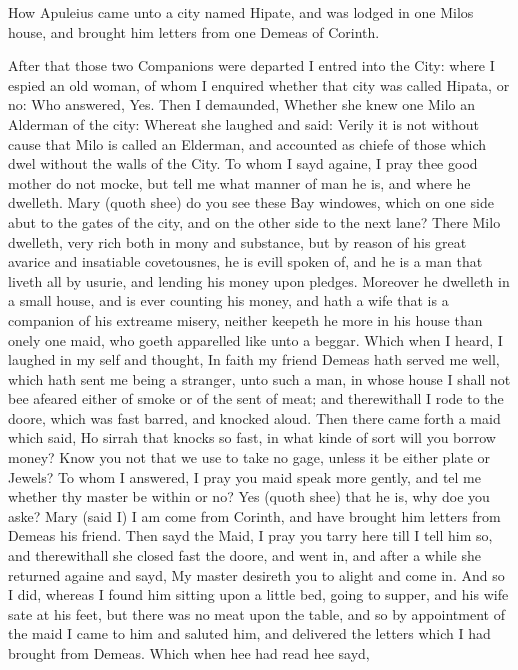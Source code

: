 
How Apuleius came unto a city named Hipate, and was lodged in one Milos house,
and brought him letters from one Demeas of Corinth.

After that those two Companions were departed I entred into the City: where I
espied an old woman, of whom I enquired whether that city was called Hipata, or
no: Who answered, Yes. Then I demaunded, Whether she knew one Milo an Alderman
of the city: Whereat she laughed and said: Verily it is not without cause that
Milo is called an Elderman, and accounted as chiefe of those which dwel without
the walls of the City. To whom I sayd againe, I pray thee good mother do not
mocke, but tell me what manner of man he is, and where he dwelleth. Mary (quoth
shee) do you see these Bay windowes, which on one side abut to the gates of the
city, and on the other side to the next lane? There Milo dwelleth, very rich
both in mony and substance, but by reason of his great avarice and insatiable
covetousnes, he is evill spoken of, and he is a man that liveth all by usurie,
and lending his money upon pledges. Moreover he dwelleth in a small house, and
is ever counting his money, and hath a wife that is a companion of his extreame
misery, neither keepeth he more in his house than onely one maid, who goeth
apparelled like unto a beggar. Which when I heard, I laughed in my self and
thought, In faith my friend Demeas hath served me well, which hath sent me
being a stranger, unto such a man, in whose house I shall not bee afeared
either of smoke or of the sent of meat; and therewithall I rode to the doore,
which was fast barred, and knocked aloud. Then there came forth a maid which
said, Ho sirrah that knocks so fast, in what kinde of sort will you borrow
money? Know you not that we use to take no gage, unless it be either plate or
Jewels? To whom I answered, I pray you maid speak more gently, and tel me
whether thy master be within or no? Yes (quoth shee) that he is, why doe you
aske? Mary (said I) I am come from Corinth, and have brought him letters from
Demeas his friend. Then sayd the Maid, I pray you tarry here till I tell him
so, and therewithall she closed fast the doore, and went in, and after a while
she returned againe and sayd, My master desireth you to alight and come in. And
so I did, whereas I found him sitting upon a little bed, going to supper, and
his wife sate at his feet, but there was no meat upon the table, and so by
appointment of the maid I came to him and saluted him, and delivered the
letters which I had brought from Demeas. Which when hee had read hee sayd,
